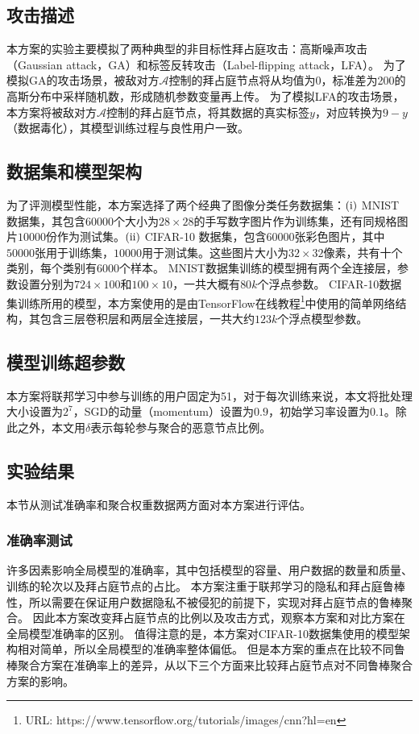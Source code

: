\subsection{攻击描述}
本方案的实验主要模拟了两种典型的非目标性拜占庭攻击：高斯噪声攻击（Gaussian attack，GA）和标签反转攻击（Label-flipping attack，LFA）。
为了模拟GA的攻击场景，被敌对方$\mathcal{A}$控制的拜占庭节点将从均值为0，标准差为200的高斯分布中采样随机数，形成随机参数变量再上传。
为了模拟LFA的攻击场景，本方案将被敌对方$\mathcal{A}$控制的拜占庭节点，将其数据的真实标签$y$，对应转换为$9-y$（数据毒化），其模型训练过程与良性用户一致。

\subsection{数据集和模型架构}
为了评测模型性能，本方案选择了两个经典了图像分类任务数据集：$(\rm \romannumeral1)$ MNIST 数据集，其包含$ 60000 $个大小为$28 \times 28$的手写数字图片作为训练集，还有同规格图片$10000$份作为测试集。$(\rm \romannumeral2)$ CIFAR-10 数据集，包含$60000$张彩色图片，其中$50000$张用于训练集，$10000$用于测试集。这些图片大小为$32\times 32$像素，共有十个类别，每个类别有$6000$个样本。
MNIST数据集训练的模型拥有两个全连接层，参数设置分别为$724 \times 100$和$100 \times 10$，一共大概有$80k$个浮点参数。
CIFAR-10数据集训练所用的模型，本方案使用的是由TensorFlow在线教程\footnote{URL: https://www.tensorflow.org/tutorials/images/cnn?hl=en}中使用的简单网络结构，其包含三层卷积层和两层全连接层，一共大约$123k$个浮点模型参数。

\subsection{模型训练超参数}
本方案将联邦学习中参与训练的用户固定为51，对于每次训练来说，本文将批处理大小设置为$2^7$，SGD的动量（momentum）设置为$0.9$，初始学习率设置为$0.1$。除此之外，本文用$\delta$表示每轮参与聚合的恶意节点比例。

\subsection{实验结果}
本节从测试准确率和聚合权重数据两方面对本方案进行评估。

\subsubsection{准确率测试}
许多因素影响全局模型的准确率，其中包括模型的容量、用户数据的数量和质量、训练的轮次以及拜占庭节点的占比。
本方案注重于联邦学习的隐私和拜占庭鲁棒性，所以需要在保证用户数据隐私不被侵犯的前提下，实现对拜占庭节点的鲁棒聚合。
因此本方案改变拜占庭节点的比例以及攻击方式，观察本方案和对比方案在全局模型准确率的区别。
值得注意的是，本方案对CIFAR-10数据集使用的模型架构相对简单，所以全局模型的准确率整体偏低。
但是本方案的重点在比较不同鲁棒聚合方案在准确率上的差异，从以下三个方面来比较拜占庭节点对不同鲁棒聚合方案的影响。

